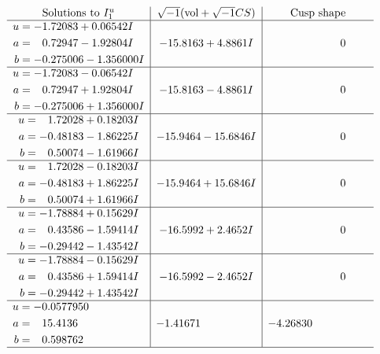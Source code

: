 \documentclass[1p]{elsarticle_modified}
\theoremstyle{definition}
\newcommand{\I}{\sqrt{-1}}
\begin{document}
$$\begin{array}{c|c|c}
\text{Solutions to }I^u_{1}& \I (\text{vol} + \sqrt{-1}CS) & \text{Cusp shape}\\
 \hline 
\begin{aligned}
u &= -1.72083 + 0.06542 I \\
a &= \phantom{-}0.72947 - 1.92804 I \\
b &= -0.275006 - 1.356000 I\end{aligned}
 & -15.8163 + 4.8861 I & \phantom{-0.000000 } 0 \\ \hline\begin{aligned}
u &= -1.72083 - 0.06542 I \\
a &= \phantom{-}0.72947 + 1.92804 I \\
b &= -0.275006 + 1.356000 I\end{aligned}
 & -15.8163 - 4.8861 I & \phantom{-0.000000 } 0 \\ \hline\begin{aligned}
u &= \phantom{-}1.72028 + 0.18203 I \\
a &= -0.48183 - 1.86225 I \\
b &= \phantom{-}0.50074 - 1.61966 I\end{aligned}
 & -15.9464 - 15.6846 I & \phantom{-0.000000 } 0 \\ \hline\begin{aligned}
u &= \phantom{-}1.72028 - 0.18203 I \\
a &= -0.48183 + 1.86225 I \\
b &= \phantom{-}0.50074 + 1.61966 I\end{aligned}
 & -15.9464 + 15.6846 I & \phantom{-0.000000 } 0 \\ \hline\begin{aligned}
u &= -1.78884 + 0.15629 I \\
a &= \phantom{-}0.43586 - 1.59414 I \\
b &= -0.29442 - 1.43542 I\end{aligned}
 & -16.5992 + 2.4652 I & \phantom{-0.000000 } 0 \\ \hline\begin{aligned}
u &= -1.78884 - 0.15629 I \\
a &= \phantom{-}0.43586 + 1.59414 I \\
b &= -0.29442 + 1.43542 I\end{aligned}
 & -16.5992 - 2.4652 I & \phantom{-0.000000 } 0 \\ \hline\begin{aligned}
u &= -0.0577950\phantom{ +0.000000I} \\
a &= \phantom{-}15.4136\phantom{ +0.000000I} \\
b &= \phantom{-}0.598762\phantom{ +0.000000I}\end{aligned}
 & -1.41671\phantom{ +0.000000I} & -4.26830\phantom{ +0.000000I}\\
 \hline 
 \end{array}$$\newpage\newpage\renewcommand{\arraystretch}{1}
\end{document}
